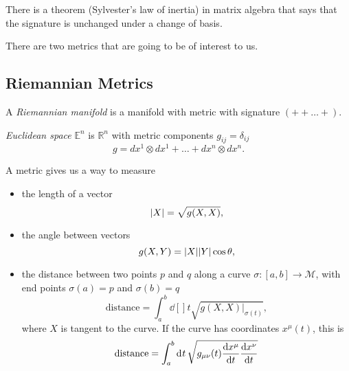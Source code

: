 \begin{leftbar}
  \begin{remark}
    There is a theorem (Sylvester's law of inertia) in matrix algebra that says that the signature is unchanged under a change of basis.
  \end{remark}
\end{leftbar}

There are two metrics that are going to be of interest to us.

\subsection*{Riemannian Metrics}%

\begin{definition}
  A \emph{Riemannian manifold} is a manifold with metric with signature $(+ + \dots +)$.
\end{definition}
\begin{definition}[]
  \emph{Euclidean space} $\mathbb{E}^n$ is $\mathbb{R}^n$ with metric components $g_{ij} = \delta_{ij}$ 
  \begin{equation}
    g = dx^1 \otimes dx^1 + \dots + dx^n \otimes dx^n.
  \end{equation}
\end{definition}

A metric gives us a way to measure 
\begin{itemize}
  \item the length of a vector
  \begin{equation}
    \abs{X} = \sqrt{g(X, X)},
  \end{equation}
  \item the angle between vectors
  \begin{equation}
    g(X, Y) = \abs{X} \abs{Y} \cos\theta,
  \end{equation}
\item the distance between two points $p$ and $q$ along a curve $\sigma\colon [a, b] \to \mathcal{M}$, with end points $\sigma(a) = p$ and $\sigma(b) = q$
  \begin{equation}
    \text{distance} = \int_{a}^{b} \dd[]{t} \sqrt{g(X, X) \rvert_{\sigma(t)}},
  \end{equation}
  where $X$ is tangent to the curve.
  If the curve has coordinates $x^\mu(t)$, this is
  \begin{equation}
    \text{distance} = \int_{a}^{b} \dd[]{t} \sqrt{g_{\mu\nu}(t) \dv{x^\mu}{t} \dv{x^\nu}{t}}
  \end{equation}
\end{itemize}


